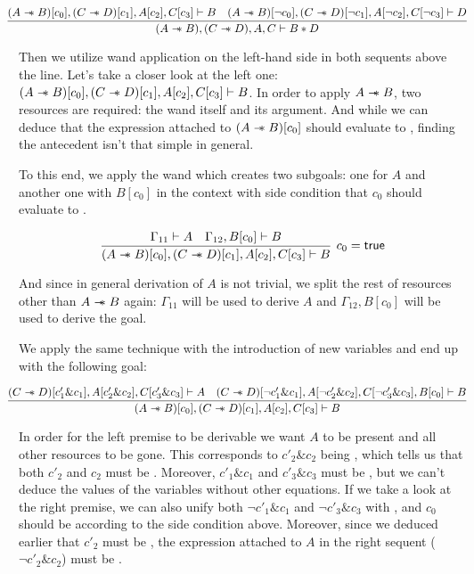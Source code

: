 \[\hspace{-0.03\linewidth}
\infer{(A \wand B), (C \wand D), A, C \vdash B \ast D}
      {(A \wand B)[c_0], (C \wand D)[c_1], A[c_2], C[c_3] \vdash B  &
       (A \wand B)[\neg c_0], (C \wand D)[\neg c_1] , A[\neg c_2] , C[\neg c_3] \vdash D}
\]

Then we utilize wand application on the left-hand side in both sequents above the line.
Let's take a closer look at the left one: \((A \mathrel{-\mkern-6mu*} B)[c_0], (C \mathrel{-\mkern-6mu*} D)[c_1], A[c_2], C[c_3] \vdash B\).
In order to apply \(A \mathrel{-\mkern-6mu*} B\), two resources are required: the wand itself and its argument.
And while we can deduce that the expression attached to \((A \mathrel{-\mkern-6mu*} B)[c_0]\) should evaluate to \true, finding the antecedent isn't that simple in general.

To this end, we apply the wand which creates two subgoals: one for \(A\) and another one with \(B[c_0]\) in the context with side condition that \(c_0\) should evaluate to \true.

\[
\infer[c_0 = \true]
      {(A \wand B)[c_0], (C \wand D)[c_1],
        A[c_2], C[c_3] \vdash B}
      { \Gamma_{11} \vdash A &
        \Gamma_{12}, B[c_0] \vdash B}
\]

And since in general derivation of \(A\) is not trivial, we split the rest of resources other than \(A \mathrel{-\mkern-6mu*} B\) again: \(\Gamma_{11}\) will be used to derive \(A\) and \(\Gamma_{12}, B[c_0]\) will be used to derive the goal.

We apply the same technique with the introduction of new variables and end up with the following goal:

\[
\hspace{-0.03\linewidth}
\infer{(A \wand B)[c_0], (C \wand D)[c_1], A[c_2], C[c_3] \vdash B}
      {(C \wand D)[c'_1 \& c_1], A[c'_2 \& c_2], C[c'_3 \& c_3] \vdash A &
       (C \wand D)[\neg c'_1 \& c_1], A[\neg c'_2 \& c_2], C[\neg c'_3 \& c_3], B[c_0] \vdash B}
\]

In order for the left premise to be derivable we want \(A\) to be present and all other resources to be gone.
This corresponds to \(c'_2 \& c_2\) being \true, which tells us that both \(c'_2\) and \(c_2\) must be \true.
Moreover, \(c'_1 \& c_1\) and \(c'_3 \& c_3\) must be \false, but we can't deduce the values of the variables without other equations.
If we take a look at the right premise, we can also unify both \(\neg c'_1 \& c_1\) and \(\neg c'_3 \& c_3\) with \false, and \(c_0\) should be \true according to the side condition above.
Moreover, since we deduced earlier that \(c'_2\) must be \true, the expression attached to \(A\) in the right sequent (\(\neg c'_2 \& c_2\)) must be \false.



